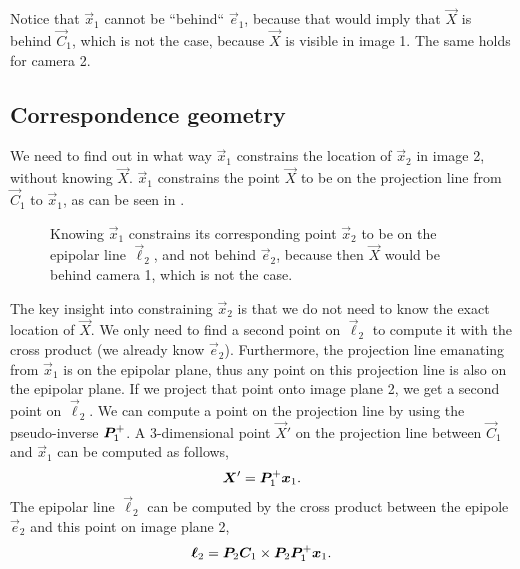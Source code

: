 Notice that $\vec{x}_1$ cannot be ``behind`` $\vec{e}_1$, because that would
imply that $\vec{X}$ is behind $\vec{C}_1$, which is not the case, because
$\vec{X}$ is visible in image 1. The same holds for camera 2.


\subsection{Correspondence geometry}

We need to find out in what way $\vec{x}_1$ constrains the location of
$\vec{x}_2$ in image 2, without knowing $\vec{X}$. $\vec{x}_1$ constrains the
point $\vec{X}$ to be on the projection line from $\vec{C}_1$ to $\vec{x}_1$,
as can be seen in .

\begin{figure}[ht]
    \centering
    \caption{Knowing $\vec{x}_1$ constrains its corresponding point $\vec{x}_2$
    to be on the epipolar line $\vec{\ell}_2$, and not behind $\vec{e}_2$,
    because then $\vec{X}$ would be behind camera 1, which is not the case.}
    \label{fig:image-1-constraint}
\end{figure}

The key insight into constraining $\vec{x}_2$ is that we do not need to know
the exact location of $\vec{X}$. We only need to find a second point on
$\vec{\ell}_2$ to compute it with the cross product (we already know
$\vec{e}_2$). Furthermore, the projection line emanating from $\vec{x}_1$ is on
the epipolar plane, thus any point on this projection line is also on the
epipolar plane. If we project that point onto image plane 2, we get a second
point on $\vec{\ell}_2$. We can compute a point on the projection line by using
the pseudo-inverse $\bm{P}_1^+$.
A 3-dimensional point $\vec{X}'$ on the projection line between $\vec{C}_1$ and
$\vec{x}_1$ can be computed as follows, \[
  \bm{X}' = \bm{P}_1^+ \bm{x}_1
.\]
The epipolar line $\vec{\ell}_2$ can be computed by the cross product between
the epipole $\vec{e}_2$ and this point on image plane 2, \[
  \bm{\ell}_2 = \bm{P}_2 \bm{C}_1 \times \bm{P}_2 \bm{P}_1^+ \bm{x}_1
.\]

